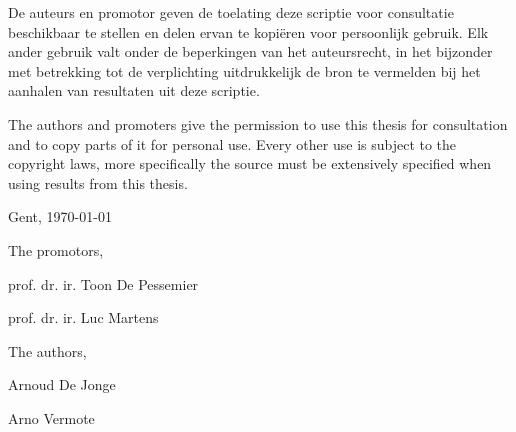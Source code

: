 

\par\vspace*{\fill}

De auteurs en promotor geven de toelating deze scriptie voor consultatie beschikbaar te stellen en delen ervan te kopi\"eren voor persoonlijk gebruik. Elk ander gebruik valt onder de beperkingen van het auteursrecht, in het bijzonder met betrekking tot de verplichting uitdrukkelijk de bron te vermelden bij het aanhalen van resultaten uit deze scriptie.

The authors and promoters give the permission to use this thesis for consultation and to copy parts of it for personal use. Every other use is subject to the copyright laws, more specifically the source must be extensively specified when using results from this thesis.

\vspace{1cm}

Gent, \today %

\vspace{1cm}

\begin{minipage}[t][4cm][t]{0.5\textwidth}
\raggedright
The promotors,

\vspace{2.5cm}

prof. dr. ir. Toon De Pessemier

prof. dr. ir. Luc Martens
\end{minipage}
\begin{minipage}[t][4cm][t]{0.48\textwidth}
\raggedright
The authors,

\vspace{2.5cm}

Arnoud De Jonge

Arno Vermote
\end{minipage}

\thispagestyle{empty}

